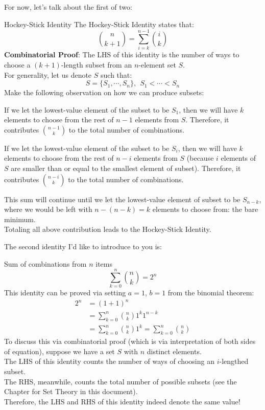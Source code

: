 For now, let's talk about the first of two:
\begin{ln-theorem}{Hockey-Stick Identity}{}
    The Hockey-Stick Identity states that:
    \[\binom{n}{k + 1} = \sum_{i = k}^{n - 1} \binom{i}{k}\]
    \tcblower
    \textbf{Combinatorial Proof}:
    The LHS of this identity is the number of ways to choose a $(k + 1)$-length subset from an $n$-element set $S$. \\
    For generality, let us denote $S$ such that:
    \[S = \{S_1, \cdots, S_n\},\ \ S_1 < \cdots < S_n\]
    Make the following observation on how we can produce subsets:
    \begin{bindenum}
        \item If we let the lowest-value element of the subset to be $S_1$, then we will have $k$ elements to choose from the rest of $n - 1$ elements from $S$. Therefore, it contributes $\binom{n - 1}{k}$ to the total number of combinations.
        \item If we let the lowest-value element of the subset to be $S_i$, then we will have $k$ elements to choose from the rest of $n - i$ elements from $S$ (because $i$ elements of $S$ are smaller than or equal to the smallest element of subset). Therefore, it contributes $\binom{n - i}{k}$ to the total number of combinations.
    \end{bindenum}
    This sum will continue until we let the lowest-value element of subset to be $S_{n - k}$, where we would be left with $n - (n - k) = k$ elements to choose from: the bare minimum. \\
    Totaling all above contribution leads to the Hockey-Stick Identity.
\end{ln-theorem}

The second identity I'd like to introduce to you is:
\begin{ln-theorem}{Sum of combinations from $n$ items}{}
    \[\sum_{k = 0}^n \binom{n}{k} = 2^n\]
    \tcblower
    This identity can be proved via setting $a = 1$, $b = 1$ from the binomial theorem:
    \begin{align*}
        2^n &= (1 + 1)^n \\
        &= \sum_{k = 0}^n \binom{n}{k} {1}^k {1}^{n - k} \\
        &= \sum_{k = 0}^n \binom{n}{k} {1}^k = \sum_{k = 0}^n \binom{n}{k}
    \end{align*}
    To discuss this via combinatorial proof (which is via interpretation of both sides of equation), suppose we have a set $S$ with $n$ distinct elements. \\
    The LHS of this identity counts the number of ways of choosing an $i$-lengthed subset. \\
    The RHS, meanwhile, counts the total number of possible subsets (see the Chapter for Set Theory in this document). \\
    Therefore, the LHS and RHS of this identity indeed denote the same value!
\end{ln-theorem}


